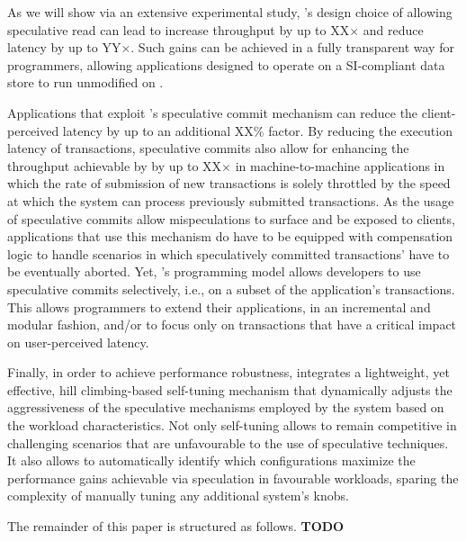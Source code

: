 As we will show via an extensive experimental study, \specula's design choice of allowing speculative read can lead to increase throughput by up to XX$\times$ and reduce latency by up to YY$\times$. Such gains can be achieved in a fully transparent way for programmers, allowing applications designed to operate on a SI-compliant data store to run unmodified on \specula.

Applications that exploit \specula's speculative commit mechanism can reduce the client-perceived latency by up to an additional XX\% factor. By reducing the execution latency of transactions,  speculative commits also allow for enhancing the throughput achievable by \specula by up to XX$\times$ in machine-to-machine applications in which the rate of submission of new transactions is solely throttled by the speed at which the system can process previously submitted transactions. As the usage of speculative commits allow mispeculations to surface and be exposed to clients, applications that use this mechanism do have to be equipped with compensation logic to handle scenarios in which speculatively committed transactions' have to be eventually aborted.  Yet, \specula's programming model allows developers to use speculative commits selectively, i.e., on a subset of the application's transactions. This allows programmers to extend their applications, in an incremental and modular fashion, and/or to focus only on  transactions that have a critical impact on user-perceived latency.

Finally, in order to achieve performance robustness, \specula integrates a lightweight, yet effective, hill climbing-based self-tuning  mechanism that dynamically adjusts the aggressiveness of the speculative mechanisms employed by the system based on the workload characteristics. Not only self-tuning allows \specula to remain competitive in challenging scenarios that are unfavourable to the use of speculative techniques. It also allows to automatically identify which configurations maximize the performance gains achievable via speculation in favourable workloads, sparing the complexity of manually tuning any additional system's knobs.

The remainder of this paper is structured as follows. {\bf TODO}


